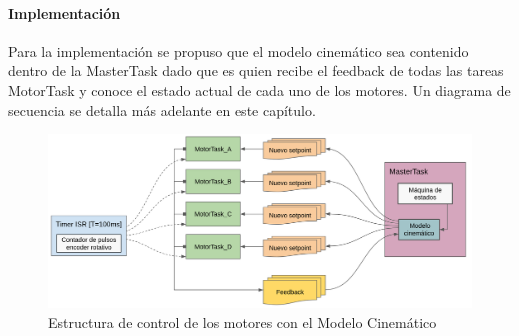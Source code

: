 \paragraph{Implementación} \mbox{} \vspace{8pt}

Para la implementación se propuso que el modelo cinemático sea contenido dentro de la MasterTask dado que es quien recibe el feedback de todas las tareas MotorTask y conoce el estado actual de cada uno de los motores. Un diagrama de secuencia se detalla más adelante en este capítulo.

\begin{figure}[H]
    \centering
    \hspace*{-0.75cm}
    \includegraphics[width=1.1\linewidth]{images/diag_comp_esp32_modelo_cinem.png}
    \caption{Estructura de control de los motores con el Modelo Cinemático}
    \label{fig:diagcomponentesp32modelocinem}
\end{figure}
